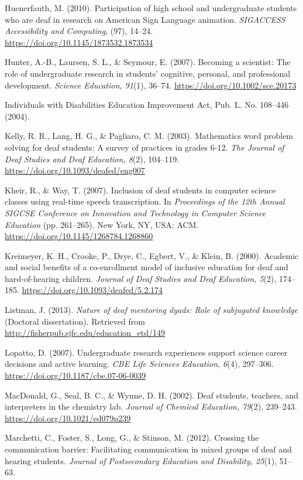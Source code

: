 \documentclass[11.5pt]{sig-alternate} %
\begin{document}
Huenerfauth, M. (2010). Participation of high school and undergraduate students who are deaf in research on American Sign Language animation. \textit{SIGACCESS Accessibility and Computing}, (97), 14–24. \url{https://doi.org/10.1145/1873532.1873534}

Hunter, A.-B., Laursen, S. L., \& Seymour, E. (2007). Becoming a scientist: The role of undergraduate research in students’ cognitive, personal, and professional development. \textit{Science Education, 91}(1), 36–74. \url{https://doi.org/10.1002/sce.20173}

Individuals with Disabilities Education Improvement Act, Pub. L. No. 108–446 (2004).

Kelly, R. R., Lang, H. G., \& Pagliaro, C. M. (2003). Mathematics word problem solving for deaf students: A survey of practices in grades 6-12. \textit{The Journal of Deaf Studies and Deaf Education, 8}(2), 104–119. \url{https://doi.org/10.1093/deafed/eng007}

Kheir, R., \& Way, T. (2007). Inclusion of deaf students in computer science classes using real-time speech transcription. In \textit{Proceedings of the 12th Annual SIGCSE Conference on Innovation and Technology in Computer Science Education} (pp. 261–265). New York, NY, USA: ACM. \url{https://doi.org/10.1145/1268784.1268860}

Kreimeyer, K. H., Crooke, P., Drye, C., Egbert, V., \& Klein, B. (2000). Academic and social benefits of a co-enrollment model of inclusive education for deaf and hard-of-hearing children. \textit{Journal of Deaf Studies and Deaf Education, 5}(2), 174–185. \url{https://doi.org/10.1093/deafed/5.2.174}

Listman, J. (2013). \textit{Nature of deaf mentoring dyads: Role of subjugated knowledge} (Doctoral dissertation). Retrieved from \url{http://fisherpub.sjfc.edu/education\_etd/149}

Lopatto, D. (2007). Undergraduate research experiences support science career decisions and active learning. \textit{CBE Life Sciences Education, 6}(4), 297–306. \url{https://doi.org/10.1187/cbe.07-06-0039}

MacDonald, G., Seal, B. C., \& Wynne, D. H. (2002). Deaf students, teachers, and interpreters in the chemistry lab. \textit{Journal of Chemical Education, 79}(2), 239–243. \url{https://doi.org/10.1021/ed079p239}

Marchetti, C., Foster, S., Long, G., \& Stinson, M. (2012). Crossing the communication barrier: Facilitating communication in mixed groups of deaf and hearing students. \textit{Journal of Postsecondary Education and Disability, 25}(1), 51–63.
\end{document}
